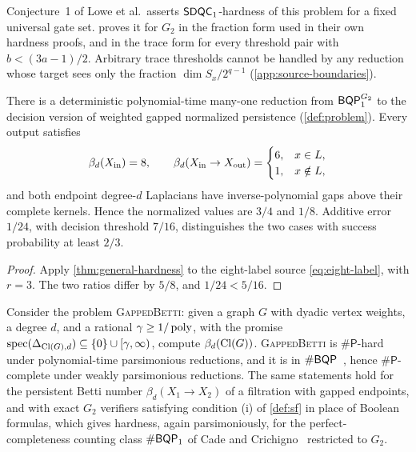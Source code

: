 Conjecture~1 of Lowe et al.\ asserts \(\mathsf{SDQC}_{1}\)-hardness of this problem
for a fixed universal gate set.   proves it for \(G_2\) in the
fraction form used in their own hardness proofs, and in the trace form for
every threshold pair with \(b<(3a-1)/2\).  Arbitrary trace thresholds
cannot be handled by any reduction whose target sees only the fraction
\(\dim S_x/2^{q-1}\) (\cref{app:source-boundaries}).

\begin{theorem}
\label{thm:weighted-hardness}
There is a deterministic polynomial-time many-one reduction from
\(\mathsf{BQP}_{1}^{G_2}\) to the decision version of weighted gapped normalized
persistence (\cref{def:problem}).  Every output
satisfies
\[
\beta_d(X_{\mathrm{in}})=8,\qquad
\beta_d(X_{\mathrm{in}}\to X_{\mathrm{out}})=
\begin{cases}6,&x\in L,\\1,&x\notin L,\end{cases}
\]
and both endpoint degree-\(d\) Laplacians have inverse-polynomial gaps above
their complete kernels.  Hence the normalized values are \(3/4\) and \(1/8\).
Additive error \(1/24\), with decision threshold \(7/16\), distinguishes the
two cases with success probability at least \(2/3\).
\end{theorem}

\begin{proof}
Apply \cref{thm:general-hardness} to the eight-label source
\cref{eq:eight-label}, with \(r=3\).  The two ratios differ by \(5/8\), and
\(1/24<5/16\).
\end{proof}

\begin{theorem}
\label{thm:gapped-betti}
Consider the problem \textnormal{\textsc{GappedBetti}}: given a graph \(G\) with dyadic
vertex weights, a degree \(d\), and a rational \(\gamma\ge1/\operatorname{poly}\), with
the promise \(\operatorname{spec}(\Delta_{\operatorname{Cl}(G),d})\subseteq\{0\}\cup[\gamma,\infty)\),
compute \(\beta_d(\operatorname{Cl}(G))\).  \textnormal{\textsc{GappedBetti}} is \(\#\mathsf P\)-hard under
polynomial-time parsimonious reductions, and it is in
\(\#\mathsf{BQP}\)~\cite{brown2011computational}, hence \(\#\mathsf P\)-complete under
weakly parsimonious reductions.  The same statements hold for the persistent
Betti number \(\beta_d(X_1\to X_2)\) of a filtration with gapped endpoints,
and with exact \(G_2\) verifiers satisfying condition (i) of \cref{def:sf} in
place of Boolean formulas, which gives hardness, again parsimoniously, for
the perfect-completeness counting class \(\#\mathsf{BQP}_{1}\) of Cade and
Crichigno~\cite{cade2024complexity} restricted to \(G_2\).
\end{theorem}

